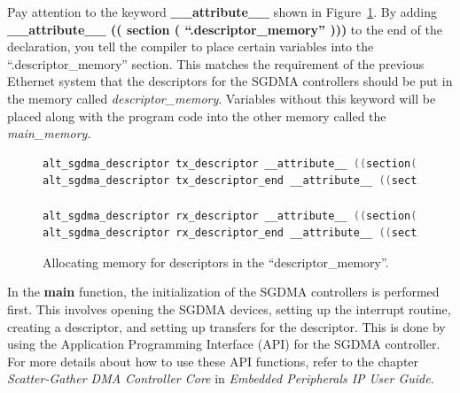 \documentclass[11pt, twoside, pdftex]{article}
\begin{document}
Pay attention to the keyword {\bf \_\_attribute\_\_} shown in Figure~\ref{fig:attribute_keyword}. By adding {\bf \_\_attribute\_\_ (( section ( ``.descriptor\_memory'' )))} to the end of the declaration, you tell the compiler to place certain variables into the ``.descriptor\_memory'' section. This matches the requirement of the previous Ethernet system that the descriptors for the SGDMA controllers should be put in the memory called {\it descriptor\_memory}. Variables without this keyword will be placed along with the program code into the other memory called the {\it main\_memory}. 

\begin{figure}[H]
	\begin{lstlisting}[language=C]
alt_sgdma_descriptor tx_descriptor __attribute__ ((section(".descriptor_memory")));
alt_sgdma_descriptor tx_descriptor_end __attribute__ ((section(".descriptor_memory")));

alt_sgdma_descriptor rx_descriptor __attribute__ ((section(".descriptor_memory")));
alt_sgdma_descriptor rx_descriptor_end __attribute__ ((section(".descriptor_memory")));
	\end{lstlisting}
	\caption{Allocating memory for descriptors in the ``descriptor\_memory''.}
	\label{fig:attribute_keyword}
\end{figure}

In the {\bf main} function, the initialization of the SGDMA controllers is performed first. This involves opening the SGDMA devices, setting up the interrupt routine, creating a descriptor, and setting up transfers for the descriptor. This is done by using the Application Programming Interface (API) for the SGDMA controller. For more details about how to use these API functions, refer to the chapter {\it Scatter-Gather DMA Controller Core} in {\it Embedded Peripherals IP User Guide}.
\end{document}
